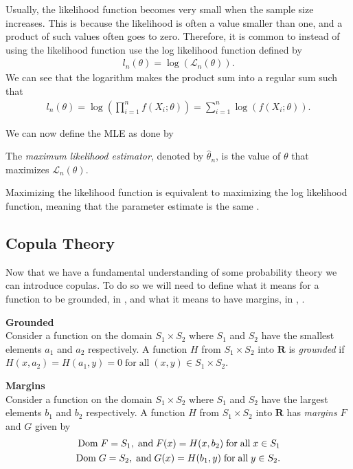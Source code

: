 Usually, the likelihood function becomes very small when the sample size increases. This is because the likelihood is often a value smaller than one, and a product of such values often goes to zero. Therefore, it is common to instead of using the likelihood function use the log likelihood function defined by 
\begin{align*}
    l_n(\theta) = \log(\mathcal{L}_n(\theta)).
\end{align*}
We can see that the logarithm makes the product sum into a regular sum such that 
\begin{align*}
    l_n(\theta) = \log \left( \prod_{i=1}^n f(X_i;\theta) \right)= \sum_{i = 1}^n \log( f(X_i;\theta)).
\end{align*}

We can now define the \gls{MLE} as done by 
\begin{definition}
    The \emph{maximum likelihood estimator}, denoted by $\hat\theta_n$, is the value of $\theta$ that maximizes $\mathcal{L}_n(\theta)$.
\end{definition}
Maximizing the likelihood function is equivalent to maximizing the log likelihood function, meaning that the parameter estimate is the same . 


\subsection{Copula Theory}\label{sec:CopulaTheory}
Now that we have a fundamental understanding of some probability theory we can introduce copulas. To do so we will need to define what it means for a function to be grounded, in , and what it means to have margins, in , \citet[p.~9]{Nelsen2006}.

\begin{definition}\label{def:grounded}\textbf{Grounded} \\
    Consider a function on the domain $S_1\times S_2$ where $S_1$ and $S_2$ have the smallest elements $a_1$ and $a_2$ respectively. A function $H$ from $S_1\times S_2$ into $\mathbf{R}$ is \emph{grounded} if $H(x,a_2)= H(a_1,y) = 0 \;\mathrm{for \;all\;} (x,y) \in S_1\times S_2.$
\end{definition}

\begin{definition}\label{def:margins}
    \textbf{Margins}\\
    Consider a function on the domain $S_1\times S_2$ where $S_1$ and $S_2$ have the largest elements $b_1$ and $b_2$ respectively. A function $H$ from $S_1\times S_2$ into $\mathbf{R}$ has \emph{margins} $F$ and $G$ given by
    \begin{align*}
        \mathrm{Dom \;} F = S_1, \;\mathrm{and }\; F(x) = H(x,b_2) \;\mathrm{for \;all\;} x \in S_1\\
        \mathrm{Dom \;} G = S_2, \;\mathrm{and }\; G(x) = H(b_1,y) \;\mathrm{for \;all\;} y \in S_2.
    \end{align*}
\end{definition}

